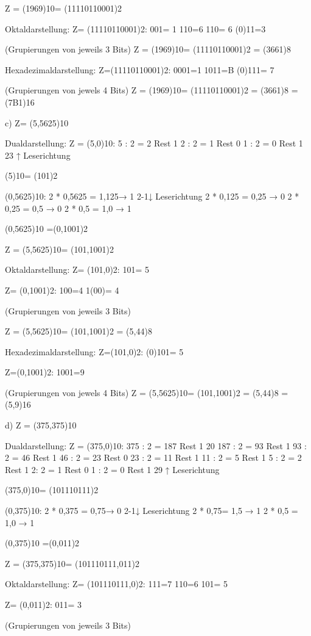 \documentclass[11pt,a4paper]{article}
\begin{document}
Z = (1969)10=  (11110110001)2

Oktaldarstellung:
Z=  (11110110001)2:
001= 1
110=6
110= 6
(0)11=3

(Grupierungen von jeweils 3 Bits)
Z = (1969)10=  (11110110001)2 = (3661)8

Hexadezimaldarstellung:
Z=(11110110001)2:
0001=1
1011=B
(0)111= 7

(Grupierungen von jewels 4 Bits)
Z = (1969)10=  (11110110001)2 = (3661)8 = (7B1)16

c)
Z= (5,5625)10

Dualdarstellung:
Z = (5,0)10:
5 : 2 = 2 Rest       1 
2 : 2 = 1 Rest        0
1 : 2 = 0 Rest        1    23 ↑ Leserichtung

(5)10= (101)2

(0,5625)10:
2 * 0,5625 = 1,125→ 1     2-1↓ Leserichtung
2 * 0,125 = 0,25 → 0
2 * 0,25 = 0,5 → 0
2 * 0,5 = 1,0 → 1

(0,5625)10 =(0,1001)2


Z = (5,5625)10=  (101,1001)2

Oktaldarstellung:
Z=  (101,0)2:
101= 5

Z=  (0,1001)2:
100=4
1(00)= 4

(Grupierungen von jeweils 3 Bits)

Z = (5,5625)10=  (101,1001)2 = (5,44)8

Hexadezimaldarstellung:
Z=(101,0)2:
(0)101= 5

Z=(0,1001)2:
1001=9

(Grupierungen von jewels 4 Bits)
Z = (5,5625)10=  (101,1001)2 = (5,44)8 = (5,9)16

d)
Z = (375,375)10


Dualdarstellung:
Z = (375,0)10:
375 : 2 = 187 Rest       1   20
187 : 2 = 93 Rest        1
93 : 2 = 46 Rest           1
46 : 2 = 23 Rest           0
23 : 2 = 11 Rest           1
11 : 2 = 5 Rest              1
5 : 2 = 2 Rest                1
2: 2 = 1  Rest                 0        
1 : 2 = 0 Rest                 1    29 ↑ Leserichtung

(375,0)10= (101110111)2

(0,375)10:
2 * 0,375 = 0,75→ 0     2-1↓ Leserichtung
2 * 0,75= 1,5 → 1
2 * 0,5 = 1,0 → 1

(0,375)10 =(0,011)2


Z = (375,375)10=  (101110111,011)2

Oktaldarstellung:
Z=  (101110111,0)2:
111=7
110=6
101= 5

Z=  (0,011)2:
011= 3

(Grupierungen von jeweils 3 Bits)
\end{document}
